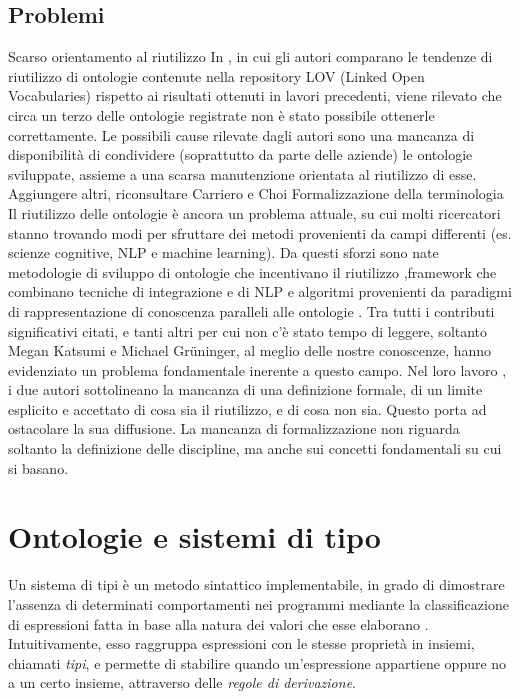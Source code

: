 \subsection{Problemi}
Scarso orientamento al riutilizzo In \cite{...}, in cui gli autori comparano le tendenze di riutilizzo di ontologie contenute nella repository LOV (Linked Open Vocabularies) rispetto ai risultati ottenuti in lavori precedenti, viene rilevato che circa un terzo delle ontologie registrate non è stato possibile ottenerle correttamente. Le possibili cause rilevate dagli autori sono una mancanza di disponibilità di condividere (soprattutto da parte delle aziende) le ontologie sviluppate, assieme a una scarsa manutenzione orientata al riutilizzo di esse.
Aggiungere altri, riconsultare Carriero e Choi
Formalizzazione della terminologia
Il riutilizzo delle ontologie è ancora un problema attuale, su cui molti ricercatori stanno trovando modi per sfruttare dei metodi provenienti da campi differenti (es. scienze cognitive, NLP e machine learning). Da questi sforzi sono nate metodologie di sviluppo di ontologie che incentivano il riutilizzo \cite{...},framework che combinano tecniche di integrazione e di NLP \cite{...} e algoritmi provenienti da paradigmi di rappresentazione di conoscenza paralleli alle ontologie \cite{...}. Tra tutti i contributi significativi citati, e tanti altri per cui non c'è stato tempo di leggere, soltanto Megan Katsumi e Michael Grüninger, al meglio delle nostre conoscenze, hanno evidenziato un problema fondamentale inerente a questo campo. Nel loro lavoro \cite{...}, i due autori sottolineano la mancanza di una definizione formale, di un limite esplicito e accettato di cosa sia il riutilizzo, e di cosa non sia. Questo porta ad ostacolare la sua diffusione. La mancanza di formalizzazione non riguarda soltanto la definizione delle discipline, ma anche sui concetti fondamentali su cui si basano.

\evv

\section{Ontologie e sistemi di tipo}
Un sistema di tipi è un metodo sintattico implementabile, in grado di dimostrare l'assenza di determinati comportamenti nei programmi mediante la classificazione di espressioni fatta in base alla natura dei valori che esse elaborano \cite{pierceTypesBook}. Intuitivamente, esso raggruppa espressioni con le stesse proprietà in insiemi, chiamati \textit{tipi}, e permette di stabilire quando un'espressione appartiene oppure no a un certo insieme, attraverso delle \textsl{regole di derivazione}.

